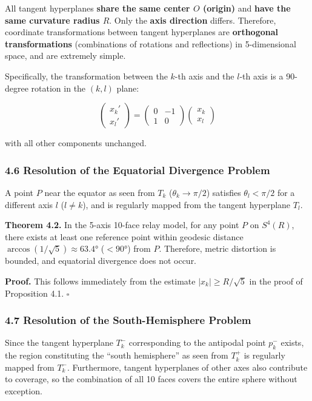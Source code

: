 \documentclass[a4paper,11pt]{article}
\begin{document}
All tangent hyperplanes \textbf{share the same center \(O\) (origin)}
and \textbf{have the same curvature radius \(R\)}. Only the \textbf{axis
direction} differs. Therefore, coordinate transformations between
tangent hyperplanes are \textbf{orthogonal transformations}
(combinations of rotations and reflections) in 5-dimensional space, and
are extremely simple.

Specifically, the transformation between the \(k\)-th axis and the
\(l\)-th axis is a 90-degree rotation in the \((k, l)\) plane:

\[\begin{pmatrix} x_k' \\ x_l' \end{pmatrix} = \begin{pmatrix} 0 & -1 \\ 1 & 0 \end{pmatrix} \begin{pmatrix} x_k \\ x_l \end{pmatrix}\]

with all other components unchanged.

\subsubsection{4.6 Resolution of the Equatorial Divergence
Problem}\label{resolution-of-the-equatorial-divergence-problem}

A point \(P\) near the equator as seen from \(T_k\)
(\(\theta_k \to \pi/2\)) satisfies \(\theta_l < \pi/2\) for a different
axis \(l\) (\(l \neq k\)), and is regularly mapped from the tangent
hyperplane \(T_l\).

\textbf{Theorem 4.2.} In the 5-axis 10-face relay model, for any point
\(P\) on \(S^4(R)\), there exists at least one reference point within
geodesic distance \(\arccos(1/\sqrt{5}) \approx 63.4°\) (\(< 90°\)) from
\(P\). Therefore, metric distortion is bounded, and equatorial
divergence does not occur.

\textbf{Proof.} This follows immediately from the estimate
\(|x_k| \geq R/\sqrt{5}\) in the proof of Proposition 4.1. \(\square\)

\subsubsection{4.7 Resolution of the South-Hemisphere
Problem}\label{resolution-of-the-south-hemisphere-problem}

Since the tangent hyperplane \(T_k^-\) corresponding to the antipodal
point \(p_k^-\) exists, the region constituting the ``south hemisphere''
as seen from \(T_k^+\) is regularly mapped from \(T_k^-\). Furthermore,
tangent hyperplanes of other axes also contribute to coverage, so the
combination of all 10 faces covers the entire sphere without exception.
\end{document}
